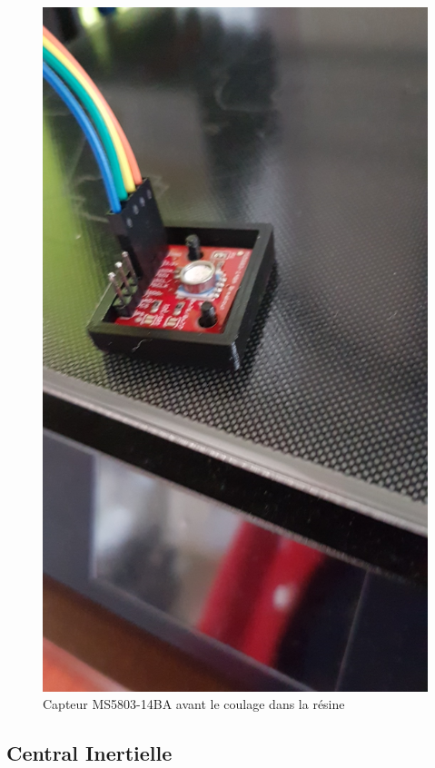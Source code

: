 \documentclass[a4paper,11pt]{report}
\begin{document}
				\begin{figure}[!h]
					\begin{center}
						\includegraphics[scale=0.2]{Photos/Capture40.jpeg}
						\caption{Capteur MS5803-14BA avant le coulage dans la résine}
					\end{center}
				\end{figure}
			\newpage
					
		\subsection{Central Inertielle}
		
\end{document}
